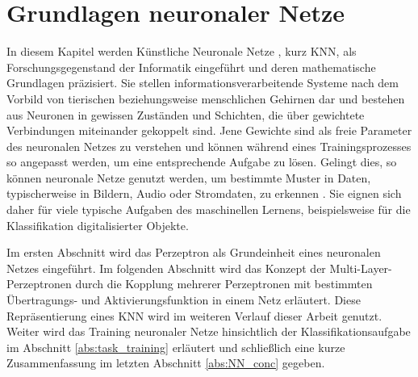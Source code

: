\chapter{Grundlagen neuronaler Netze}
\label{kap:NN}

In diesem Kapitel werden Künstliche Neuronale Netze \cite{dayhoff1990neural}, kurz KNN, als Forschungsgegenstand der Informatik eingeführt und deren mathematische Grundlagen präzisiert. 
Sie stellen informationsverarbeitende Systeme nach dem Vorbild von tierischen beziehungsweise menschlichen Gehirnen dar und bestehen aus Neuronen in gewissen Zuständen und Schichten, die über gewichtete Verbindungen miteinander gekoppelt sind. Jene Gewichte sind als freie Parameter des neuronalen Netzes zu verstehen und können während eines Trainingsprozesses so angepasst werden, um eine entsprechende Aufgabe zu lösen.  
Gelingt dies, so können neuronale Netze genutzt werden, um bestimmte Muster in Daten, typischerweise in Bildern, Audio oder Stromdaten, zu erkennen \cite{pandya1995pattern, pao1989adaptive, urbaniak2021quality}.
Sie eignen sich daher für viele typische Aufgaben des maschinellen Lernens, beispielsweise für die Klassifikation digitalisierter Objekte.

Im ersten Abschnitt wird das Perzeptron \cite{rosenblatt1958perceptron} als Grundeinheit eines neuronalen Netzes eingeführt. 
Im folgenden Abschnitt wird das Konzept der Multi-Layer-Perzeptronen \cite{werbos1988generalization} durch die Kopplung mehrerer Perzeptronen mit bestimmten Übertragungs- und Aktivierungsfunktion in einem Netz erläutert. Diese Repräsentierung eines KNN wird im weiteren Verlauf dieser Arbeit genutzt. Weiter wird das Training neuronaler Netze hinsichtlich der Klassifikationsaufgabe im Abschnitt \ref{abs:task_training} erläutert und schließlich eine kurze Zusammenfassung im letzten Abschnitt \ref{abs:NN_conc} gegeben.

